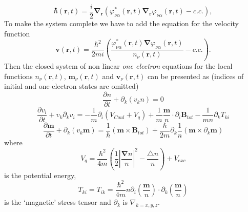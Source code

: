 \documentclass[aps,preprint,twocolumn,10pt]{revtex4}%
\begin{document}
\begin{equation}
\overset{\bullet}{n}(\mathbf{r,}t)=\frac{i}{2}\mathbf{\nabla}_{\mathbf{r}%
}(\varphi_{\nu\alpha}^{\ast}\left(  \mathbf{r,}t\right)  \mathbf{\nabla
}_{\mathbf{r}}\varphi_{\nu\alpha}\left(  \mathbf{r,}t\right)
-c.c.),\label{nDF}%
\end{equation}
To make the system complete we have to add the equation for the velocity
function%
\begin{equation}
\mathbf{v}\left(  \mathbf{r},t\right)  =\frac{\hbar^{2}}{2mi}\left(
\frac{\varphi_{\nu\alpha}^{\ast}\left(  \mathbf{r},t\right)  \mathbf{\nabla
}\varphi_{\nu\alpha}\left(  \mathbf{r},t\right)  }{n_{\nu}\left(
\mathbf{r},t\right)  }-c.c.\right)  .\label{velocity}%
\end{equation}
Then the closed system of non linear \textit{one electron} equations for the
local functions $n_{\nu}\left(  \mathbf{r},t\right)  $, $\mathbf{m}_{\nu
}\left(  \mathbf{r},t\right)  $ and $\mathbf{v}_{\nu}\left(  \mathbf{r}%
,t\right)  $ can be presented as (indices of initial and one-electron states
are omitted)%
\begin{equation}
\frac{\partial n}{\partial t}+\partial_{k}\left(  v_{k}n\right)
=0\label{denseq}%
\end{equation}%
\begin{equation}
\frac{\partial v_{i}}{\partial t}+v_{k}\partial_{k}v_{i}=-\frac{1}{m}%
\partial_{i}\left(  V_{Coul}+V_{q}\right)  +\frac{1}{m}\frac{\mathbf{m}}%
{n}\cdot\partial_{i}\mathbf{B}_{tot}-\frac{1}{mn}\partial_{k}T_{ki}%
\label{veloceq}%
\end{equation}%
\begin{equation}
\frac{\partial\mathbf{m}}{\partial t}+\partial_{k}\left(  v_{k}\mathbf{m}%
\right)  =\frac{1}{\hbar}\left(  \mathbf{m\times B}_{tot}\right)  +\frac
{\hbar}{2m}\partial_{k}\frac{1}{n}\left(  \mathbf{m}\times\partial
_{k}\mathbf{m}\right)  \label{momeq}%
\end{equation}
where%
\begin{equation}
V_{q}=\frac{\hbar^{2}}{4m}\left(  \frac{1}{2}\left\vert \frac{\mathbf{\nabla
}n}{n}\right\vert ^{2}-\frac{\triangle n}{n}\right)  +V_{exc}%
\label{qpotential}%
\end{equation}
is the potential energy,
\begin{equation}
T_{ki}=T_{ik}=\frac{\hbar^{2}}{4m}n\partial_{i}\left(  \frac{\mathbf{m}}%
{n}\right)  \cdot\partial_{k}\left(  \frac{\mathbf{m}}{n}\right)
\label{stensor}%
\end{equation}
is the `magnetic' stress tensor and $\partial_{k}$ is $\nabla_{k=x,y,z}$.
\end{document}
